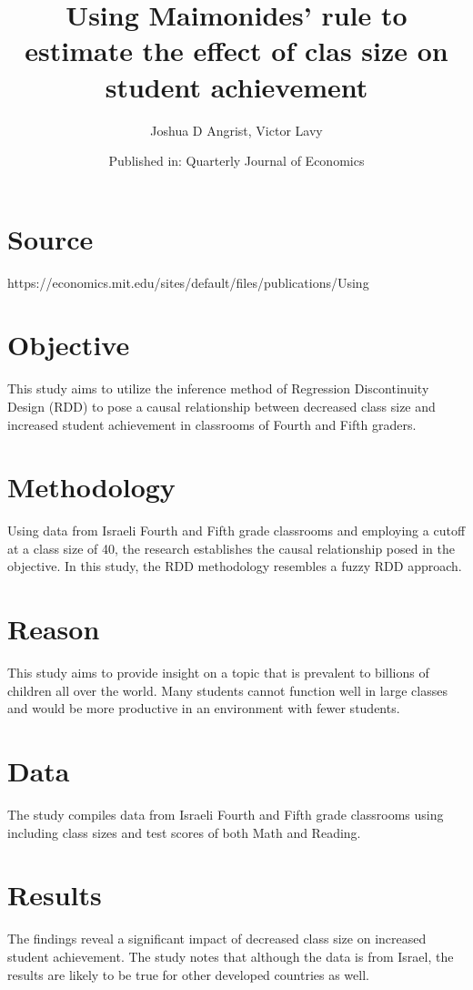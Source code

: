 \documentclass{article}
\title{Using Maimonides' rule to estimate the effect of clas size on student achievement}
\author{Joshua D Angrist, Victor Lavy}
\date{Published in: Quarterly Journal of Economics}
\begin{document}
\maketitle

\section*{Source}
https://economics.mit.edu/sites/default/files/publications/Using%

\section*{Objective}
This study aims to utilize the inference method of Regression Discontinuity Design (RDD) to pose a causal relationship between decreased class size and increased student achievement in classrooms of Fourth and Fifth graders.

\section*{Methodology}
Using data from Israeli Fourth and Fifth grade classrooms and employing a cutoff at a class size of 40, the research establishes the causal relationship posed in the objective. In this study, the RDD methodology resembles a fuzzy RDD approach.

\section*{Reason}
This study aims to provide insight on a topic that is prevalent to billions of children all over the world. Many students cannot function well in large classes and would be more productive in an environment with fewer students.

\section*{Data}
The study compiles data from Israeli Fourth and Fifth grade classrooms using including class sizes and test scores of both Math and Reading.

\section*{Results}
The findings reveal a significant impact of decreased class size on increased student achievement. The study notes that although the data is from Israel, the results are likely to be true for other developed countries as well.
\end{document}

